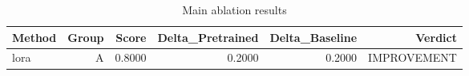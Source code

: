\begin{table}[htbp]
\centering
\caption{Main ablation results}
\label{tab:main-results}
\begin{tabular}{lrrrrr}
\toprule
\textbf{Method} & \textbf{Group} & \textbf{Score} & \textbf{Delta\_Pretrained} & \textbf{Delta\_Baseline} & \textbf{Verdict} \\
\midrule
lora & A & 0.8000 & 0.2000 & 0.2000 & IMPROVEMENT \\
\bottomrule
\end{tabular}
\end{table}